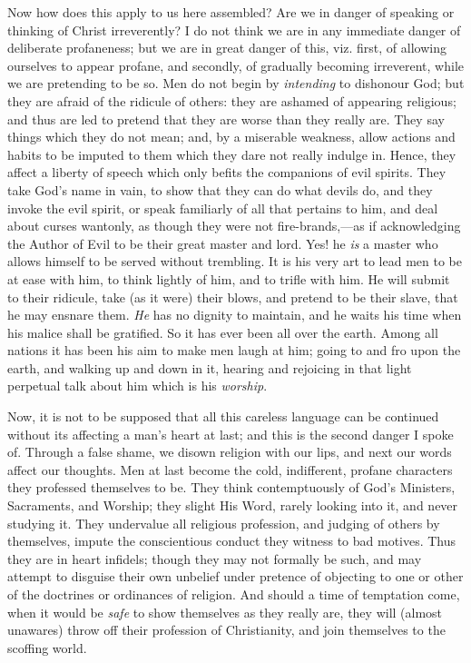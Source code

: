 Now how does this apply to us here assembled? Are we
in danger of speaking or thinking of Christ irreverently?
I do not think we are in any immediate danger of
deliberate profaneness; but we are in great danger of
this, viz. first, of allowing ourselves to appear
profane, and secondly, of gradually becoming irreverent,
while we are pretending to be so. Men do not begin by \emph{intending}
to dishonour God; but they are afraid of the ridicule of
others: they are ashamed of appearing religious; and thus
are led to pretend that they are worse than they really
are. They say things which they do not mean; and, by a
miserable weakness, allow actions and habits to be
imputed to them which they dare not really indulge in.
Hence, they affect a liberty of speech which only befits
the companions of evil spirits. They take God's name in
vain, to show that they can do what devils do, and they
invoke the evil spirit, or speak familiarly of all that
pertains to him, and deal about curses wantonly, as
though they were not fire-brands,—as if
acknowledging the Author of Evil to be their great master
and lord. Yes! he \emph{is} a master who allows himself
to be served without trembling. It is his very art to
lead men to be at ease with him, to think lightly of him,
and to trifle with him. He will submit to their ridicule,
take (as it were) their blows, and pretend to be their
slave, that he may ensnare them. \emph{He} has no dignity
to maintain, and he waits his time when his malice shall
be gratified. So it has ever been all over the earth.
Among all nations it has been his aim to make men laugh
at him; going to and fro upon the earth, and walking up
and down in it, hearing and rejoicing in that light
perpetual talk about him which is his \emph{worship}.

Now, it is not to be supposed that all this careless
language can be continued without its affecting a man's
heart at last; and this is the second danger I spoke of.
Through a false shame, we disown religion with our lips,
and next our words affect our thoughts. Men at last
become the cold, indifferent, profane characters they
professed themselves to be. They think contemptuously of
God's Ministers, Sacraments, and Worship; they slight His
Word, rarely looking into it, and never studying it. They
undervalue all religious profession, and judging of
others by themselves, impute the conscientious conduct
they witness to bad motives. Thus they are in heart
infidels; though they may not formally be such, and may
attempt to disguise their own unbelief under pretence of
objecting to one or other of the doctrines or ordinances
of religion. And should a time of temptation come, when
it would be \emph{safe} to show themselves as they really
are, they will (almost unawares) throw off their
profession of Christianity, and join themselves to the
scoffing world.

